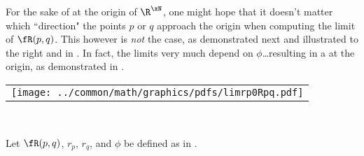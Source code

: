 \begin{minipage}{\tw-60mm}
  For the sake of  at the origin of $\R^\xN$, one might hope that 
  it doesn't matter which ``direction" the points $p$ or $q$ approach the origin
  when computing the limit of $\fR(p,q)$.
  This however is \emph{not} the case, as demonstrated next and illustrated to the right and in .
  In fact, the limits very much depend on $\phi$\ldots resulting in a  at the origin,
  as demonstrated in .
\end{minipage}\hfill%
\begin{tabular}{c}\texttt{[image: ../common/math/graphics/pdfs/limrp0Rpq.pdf]}\end{tabular}\\
\begin{proposition}
\label{prop:larcR_rp0}
Let $\fR(p,q)$, $r_p$, $r_q$, and $\phi$ be defined as in .
\end{proposition}
